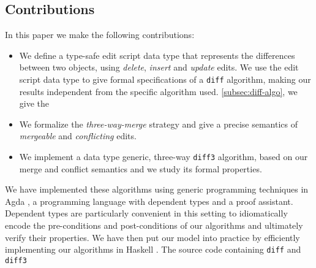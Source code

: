 \documentclass{sigplanconf}
\theoremstyle{plain}
\begin{document}

\subsection{Contributions}
In this paper we make the following contributions:
\begin{itemize}
\item We define a type-safe edit script data 
      type that represents the differences between two objects, using
      \emph{delete}, \emph{insert} and \emph{update} edits.
      We use the edit script data type to give formal specifications
      of a \texttt{diff} algorithm, making our results independent 
      from the specific algorithm used.
      \ref{subsec:diff-algo}, we give the 
    \item We formalize the \emph{three-way-merge} strategy and give a
      precise semantics of \emph{mergeable} and \emph{conflicting}
      edits. 
    \item We implement a data type generic, three-way \texttt{diff3}
      algorithm, based on our merge and conflict semantics and we
      study its formal properties.
\end{itemize}
We have implemented these algorithms using generic programming
techniques in Agda \cite{Bove09}, a programming language with dependent
types and a proof assistant. Dependent types are particularly
convenient in this setting to idiomatically encode the pre-conditions
and post-conditions of our algorithms and ultimately verify their
properties.
%
We have then put our model into practice by efficiently implementing
our algorithms in Haskell \cite{Marlow_haskell2010}.
%
%
The source code containing \texttt{diff} and \texttt{diff3}
\end{document}
